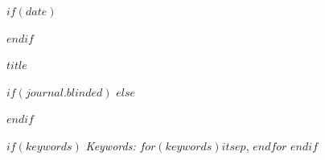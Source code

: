 \def\spacingset#1{\renewcommand{\baselinestretch}%
{#1}\small\normalsize} \spacingset{1}



$if(date)$
\date{$date$}
$endif$
\spacingset{.8}
\bigskip
\begin{center}
  {\LARGE\bf $title$}
\end{center}
\smallskip
\bigskip
\spacingset{1}
$if(journal.blinded)$
$else$

$endif$

\bigskip
\begin{abstract}
$abstract$
\end{abstract}

$if(keywords)$
\noindent%
{\it Keywords:} $for(keywords)$$it$$sep$, $endfor$
\vfill
$endif$

\newpage
\spacingset{1.9} %
